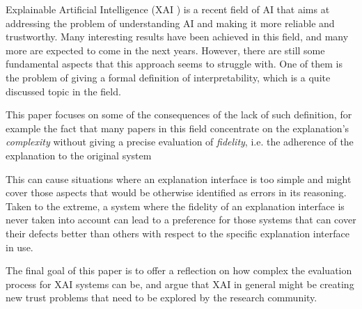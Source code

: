 \documentclass[conference]{IEEEtran}
\newcommand{\cit}[1][]{\todo[tickmarkheight=0.2cm]{cit #1}}
\begin{document}
Explainable Artificial Intelligence (XAI \cit) is a recent field of AI that aims
at addressing the problem of understanding AI and making it more reliable and
trustworthy. Many interesting results have been achieved in this field, and many
more are expected to come in the next years. However, there are still some
fundamental aspects that this approach seems to struggle with. One of them is the
problem of giving a formal definition of interpretability, which is a quite discussed topic in the field. \cit

This paper focuses on some of the consequences of the lack of such definition,
for example the fact that many papers in this field concentrate on the
explanation's \textit{complexity} without giving a precise evaluation of
\textit{fidelity}, i.e. the adherence of the explanation to the original system


This can cause
situations where an explanation interface is too simple and might cover those aspects that
would be otherwise identified as errors in its reasoning. Taken to the extreme, a system
where the fidelity of an explanation interface is never taken into account can lead to
a preference for those systems that can cover their defects better than others with
respect to the specific explanation interface in use.

The final goal of this paper is to offer a reflection on how complex the
evaluation process for XAI systems can be, and argue that XAI in general might
be creating new trust problems that need to be explored by the research
community.


\end{document}
